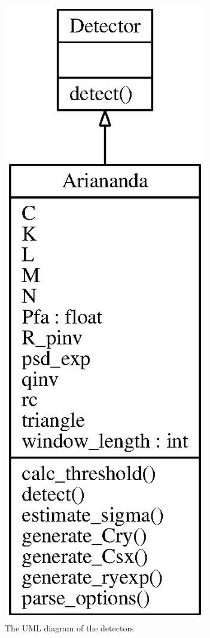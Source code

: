 \documentclass[a4paper, openany, oneside]{memoir}
\begin{document}
\begin{figure}
    \centering
    \includegraphics[width=0.3\linewidth]{./figures/classes_detection.eps}
    \caption{The UML diagram of the detectors}
    \label{fig:umldetector}
\end{figure}
\end{document}
